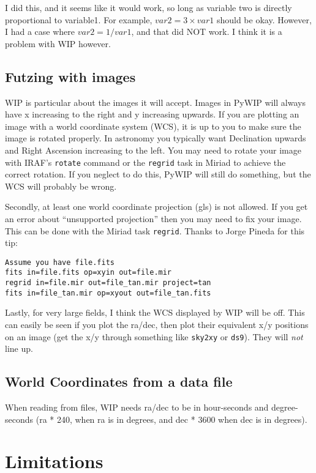 \documentclass[12pt]{article}
\newcommand{\pywip}{PyWIP}
\begin{document}
I did this, and it seems like it would work, so long as variable two is 
directly proportional to variable1.  For example, $var2 = 3\times var1$ should
be okay.  However, I had a case where $var2 = 1/var1$, and that did NOT work.
I think it is a problem with WIP however.

\subsection{\label{sec:futz-images}Futzing with images}

WIP is particular about the images it will accept. Images in \pywip{} will
always have x increasing to the right and y increasing upwards.  If you are
plotting an image with a world coordinate system (WCS), it is up to you to make
sure the image is rotated properly.  In astronomy you typically want Declination
upwards and Right Ascension increasing to the left.  You may need to rotate your
image with IRAF's \texttt{rotate} command or the \texttt{regrid} task in Miriad
to achieve the correct rotation.  If you neglect to do this, \pywip{} will still
do something, but the WCS will probably be wrong.

Secondly, at least one world coordinate projection (gls) is not allowed.  If
you get an error about ``unsupported projection'' then you may need to fix your
image.  This can be done with the Miriad task \texttt{regrid}.  Thanks to 
Jorge Pineda for this tip:
\begin{verbatim}
Assume you have file.fits
fits in=file.fits op=xyin out=file.mir
regrid in=file.mir out=file_tan.mir project=tan
fits in=file_tan.mir op=xyout out=file_tan.fits
\end{verbatim}

Lastly, for very large fields, I think the WCS displayed by WIP will be off. 
This can easily be seen if you plot the ra/dec, then plot their equivalent x/y
positions on an image (get the x/y through something like \texttt{sky2xy} or
\texttt{ds9}). They will \emph{not} line up.

\subsection{World Coordinates from a data file}

When reading from files, WIP needs ra/dec to be in hour-seconds and 
degree-seconds (ra * 240, when ra is in degrees, and dec * 3600 when dec is
in degrees).

\section{Limitations}
\end{document}
